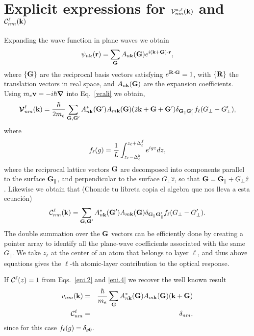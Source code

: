 \section{Explicit expressions for ${\cal V}^{a,\ell}_{nm}(\mathbf{k})$ 
and ${\cal C}^{\ell}_{nm}(\mathbf{k})$}\label{calpcalc}

Expanding the wave function in plane waves we obtain
\begin{eqnarray}\label{eni.1}
\psi_{n\mathbf{k}}(\mathbf{r})=\sum_{\mathbf{G}} A_{n\mathbf{k}}(\mathbf{G})e^{i(\mathbf{k}+\mathbf{G})\cdot\mathbf{r}}
,
\end{eqnarray}
where $\{\mathbf{G}\}$ are the reciprocal basis vectors satisfying
$e^{\mathbf{R}\cdot\mathbf{G}}=1$, with $\{\mathbf{R}\}$ the translation vectors in real
space, and $A_{n\mathbf{k}}(\mathbf{G})$ are the expansion coefficients. Using
$m_e\mathbf{v}=-i\hbar\boldsymbol{\nabla}$ into Eq.~\eqref{vcali} we obtain,\cite{mendozaPRB06}
\begin{eqnarray}\label{eni.2}
\boldsymbol{\mathcal{\cal V}}^\ell_{nm}(\mathbf{k})=
\frac{\hbar}{2m_e}
\sum_{\mathbf{G},\mathbf{G}'} A^*_{n\mathbf{k}}(\mathbf{G}')  A_{m\mathbf{k}}(\mathbf{G})
(2\mathbf{k}+\mathbf{G}+\mathbf{G}')
\delta_{\mathbf{G}_\parallel \mathbf{G}'_\parallel}  
f_\ell(G_\perp-G'_\perp)
,
\end{eqnarray}   
where
\begin{eqnarray}\label{eni.3}
f_\ell(g)=\frac{1}{L}\int_{z_\ell-\Delta^b_\ell}^{z_\ell+\Delta^f_\ell} e^{igz}dz
,
\end{eqnarray}
where the reciprocal lattice vectors $\mathbf{G}$ are decomposed into components
parallel to the surface $\mathbf{G}_\parallel$, and perpendicular to the
surface $G_\perp \hat z$, so
that $\mathbf{G} = \mathbf{G}_\parallel + G_\perp\hat z$.
Likewise we obtain that (Chon:de tu libreta copia el algebra que nos
lleva a esta ecuaci\'on)
\begin{eqnarray}\label{eni.4}
{\mathbf{\cal C}}^\ell_{nm}(\mathbf{k})=
\sum_{\mathbf{G},\mathbf{G}'} A^*_{n\mathbf{k}}(\mathbf{G}')  A_{m\mathbf{k}}(\mathbf{G})
\delta_{\mathbf{G}_\parallel \mathbf{G}'_\parallel} 
f_\ell(G_\perp-G'_\perp)
.
\end{eqnarray}  
The double summation over the $\mathbf{G}$ vectors can be efficiently done by
creating a pointer array to identify all the plane-wave coefficients
associated with the same $G_\parallel$. We take $z_\ell$
 at the center of an atom that
belongs to layer $\ell$, and thus above equations gives the $\ell$-th
 atomic-layer
contribution to the optical response.\cite{mendozaPRB06} 

If ${\mathbf{\cal C}}^\ell(z)=1$ from Eqs.~\eqref{eni.2} and \eqref{eni.4}
we recover the well known
result
\begin{eqnarray}\label{eni.21}
  v_{nm}(\mathbf{k})&=&
\frac{\hbar}{m_e}
\sum_{\mathbf{G}} A^*_{n\mathbf{k}}(\mathbf{G})  A_{m\mathbf{k}}(\mathbf{G})
(\mathbf{k}+\mathbf{G})
\nonumber\\
{\mathbf{\cal C}}^\ell_{nm}&=&\delta_{nm}
,
\end{eqnarray}  
since for this case $f_\ell(g)=\delta_{g0}$.
